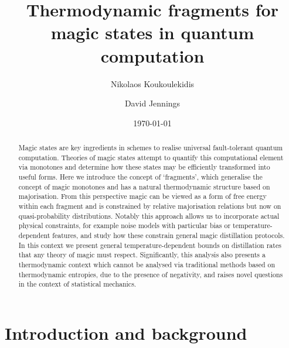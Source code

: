 \documentclass[pra,
aps,
twocolumn,
superscriptaddress,
groupedaddress,
nofootinbib,
reprint
]{revtex4-1}
\begin{document}
%
%
%

\begin{abstract}
\ddd{[To be sharpened]} Magic states are key ingredients in schemes to realise universal fault-tolerant quantum computation.
Theories of magic states attempt to quantify this computational element via monotones and determine how these states may be efficiently transformed into useful forms. Here we introduce the concept of `fragments', which generalise the concept of magic monotones and has a natural thermodynamic structure based on majorisation. From this perspective magic can be viewed as a form of free energy within each fragment and is constrained by relative majorisation relations but now on quasi-probability distributions. Notably this approach allows us to incorporate actual physical constraints, for example noise models with particular bias or temperature-dependent features, and study how these constrain general magic distillation protocols. In this context we present general temperature-dependent bounds on distillation rates that any theory of magic must respect. Significantly, this analysis also presents a thermodynamic context which cannot be analysed via traditional methods based on thermodynamic entropies, due to the presence of negativity, and raises novel questions in the context of statistical mechanics.
\end{abstract}


\title{Thermodynamic fragments for magic states in quantum computation}

\author{Nikolaos Koukoulekidis}
\author{David Jennings}

\date{\today}
\maketitle


\section{Introduction and background}
\label{sec:intro_prev}
\end{document}
